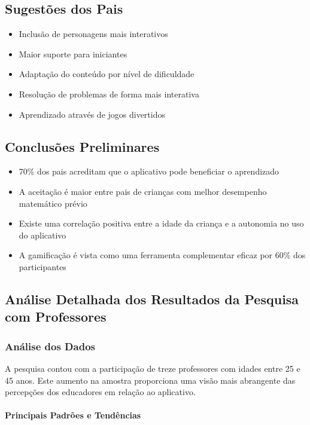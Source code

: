 \subsection{Sugestões dos Pais}

\begin{itemize}
    \item Inclusão de personagens mais interativos
    \item Maior suporte para iniciantes
    \item Adaptação do conteúdo por nível de dificuldade
    \item Resolução de problemas de forma mais interativa
    \item Aprendizado através de jogos divertidos
\end{itemize}

\subsection{Conclusões Preliminares}

\begin{itemize}
    \item 70\% dos pais acreditam que o aplicativo pode beneficiar o aprendizado
    \item A aceitação é maior entre pais de crianças com melhor desempenho matemático prévio
    \item Existe uma correlação positiva entre a idade da criança e a autonomia no uso do aplicativo
    \item A gamificação é vista como uma ferramenta complementar eficaz por 60\% dos participantes
\end{itemize}

\subsection{Análise Detalhada dos Resultados da Pesquisa com Professores}

\subsubsection{Análise dos Dados}

A pesquisa contou com a participação de treze professores com idades entre 25 e 45 anos. Este aumento na amostra proporciona uma visão mais abrangente das percepções dos educadores em relação ao aplicativo.

\paragraph{Principais Padrões e Tendências}

